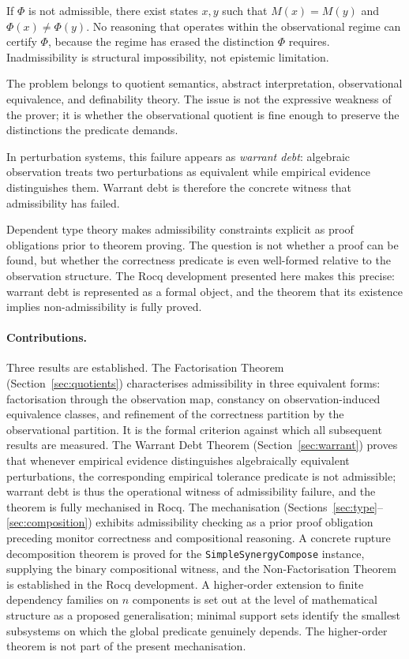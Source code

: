 \documentclass[12pt]{article}
\theoremstyle{plain}
\theoremstyle{definition}
\theoremstyle{remark}
\begin{document}
If $\Phi$ is not admissible, there exist states $x, y$ such that
$M(x) = M(y)$ and $\Phi(x) \neq \Phi(y)$.
No reasoning that operates within the observational regime can certify
$\Phi$, because the regime has erased the distinction $\Phi$ requires.
Inadmissibility is structural impossibility, not epistemic limitation.

The problem belongs to quotient semantics, abstract interpretation,
observational equivalence, and definability theory.
The issue is not the expressive weakness of the prover; it is whether
the observational quotient is fine enough to preserve the distinctions
the predicate demands.

In perturbation systems, this failure appears as
\emph{warrant debt}: algebraic observation treats two perturbations as
equivalent while empirical evidence distinguishes them.
Warrant debt is therefore the concrete witness that admissibility has
failed.

Dependent type theory makes admissibility constraints explicit as proof
obligations prior to theorem proving.
The question is not whether a proof can be found, but whether the
correctness predicate is even well-formed relative to the observation
structure.
The Rocq development presented here makes this precise: warrant debt
is represented as a formal object, and the theorem that its existence
implies non-admissibility is fully proved.

\paragraph{Contributions.}
Three results are established.
The Factorisation Theorem (Section~\ref{sec:quotients}) characterises
admissibility in three equivalent forms: factorisation through the
observation map, constancy on observation-induced equivalence classes,
and refinement of the correctness partition by the observational
partition.
It is the formal criterion against which all subsequent results are
measured.
The Warrant Debt Theorem (Section~\ref{sec:warrant}) proves that
whenever empirical evidence distinguishes algebraically equivalent
perturbations, the corresponding empirical tolerance predicate is not
admissible; warrant debt is thus the operational witness of
admissibility failure, and the theorem is fully mechanised in Rocq.
The mechanisation (Sections~\ref{sec:type}--\ref{sec:composition})
exhibits admissibility checking as a prior proof obligation preceding
monitor correctness and compositional reasoning. A concrete rupture
decomposition theorem is proved for the \texttt{SimpleSynergyCompose}
instance, supplying the binary compositional witness, and the
Non-Factorisation Theorem is established in the Rocq development. A
higher-order extension to finite dependency families on $n$
components is set out at the level of mathematical structure as a
proposed generalisation; minimal support sets identify the smallest
subsystems on which the global predicate genuinely depends. The
higher-order theorem is not part of the present mechanisation.
\end{document}
